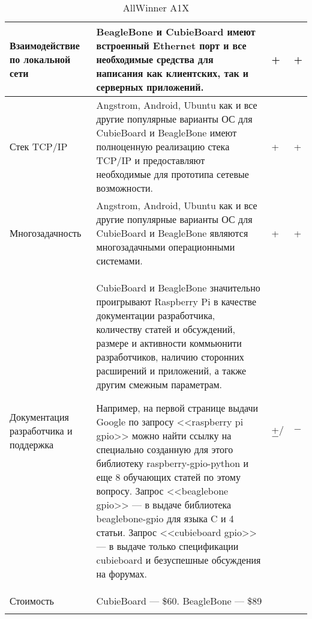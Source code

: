 \begin{longtable}{| p{} | p{} | p{1cm} | p{1cm} |}
\hline
Взаимодействие по локальной сети &

BeagleBone и CubieBoard имеют встроенный Ethernet порт и все необходимые средства для написания как клиентских, так и серверных приложений.&

+ &

+\\

\hline
Стек TCP/IP &

Angstrom, Android, Ubuntu как и все другие популярные варианты ОС для CubieBoard и BeagleBone имеют полноценную реализацию стека TCP/IP и предоставляют необходимые для прототипа сетевые возможности. &

+ &

+\\

\hline
Многозадачность &

Angstrom, Android, Ubuntu как и все другие популярные варианты ОС для CubieBoard и BeagleBone являются многозадачными операционными системами. &

+ &

+\\

\hline 
Документация разработчика и поддержка & 

CubieBoard и BeagleBone значительно проигрывают Raspberry Pi в качестве документации разработчика, количеству статей и обсуждений, размере и активности коммьюнити разработчиков, наличию сторонних расширений и приложений, а также другим смежным параметрам.

Например, на первой странице выдачи Google по запросу <<raspberry pi gpio>> можно найти ссылку на специально созданную для этого библиотеку raspberry-gpio-python\cite{RPiGPIOPython} и еще 8 обучающих статей по этому вопросу. Запрос <<beaglebone gpio>> --- в выдаче библиотека beaglebone-gpio для языка C и 4 статьи.
Запрос <<cubieboard gpio>> --- в выдаче только спецификации cubieboard и безуспешные обсуждения на форумах. &

+/$-$ &

$-$\\

\hline

Стоимость &

CubieBoard --- \$60\cite{CubieBoardBuy}. BeagleBone --- \$89\cite{BeagleBoneBuy}

&&

\\

\hline
\caption{AllWinner A1X} %
\end{longtable}
\egroup


